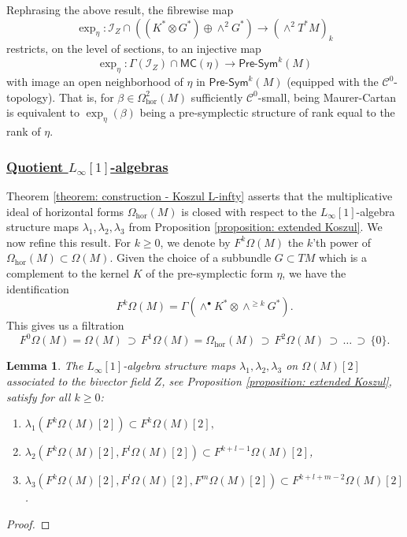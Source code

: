 \documentclass[11pt,thmsa]{amsart}
\newtheorem{lemma}[theorem]{Lemma}
\theoremstyle{definition}
\newcommand{\Presym}{\mathsf{Pre}\textrm{-}\mathsf{Sym}}
\newcommand{\hor}{\mathrm{hor}}
\newcommand{\MC}{\mathsf{MC}}
\begin{document}
{Rephrasing the above result, the fibrewise map
$$ \exp_\eta: \mathcal{I}_Z \cap ((K^*\otimes G^*)\oplus \wedge^2 G^*) \to (\wedge^2 T^*M)_k$$
restricts, on the level of sections, to an injective map
$$\boxed{ \exp_\eta: \Gamma(\mathcal{I}_Z)\cap \MC(\eta) \to  \Presym^k(M)}$$
with image an open neighborhood of $\eta$ in 
$\Presym^k(M)$ (equipped with the $\mathcal{C}^0$-topology). That is, for $\beta\in \Omega^2_\hor(M)$ sufficiently $\mathcal{C}^0$-small,
being Maurer-Cartan is equivalent to $\exp_\eta(\beta)$
being a pre-symplectic structure of rank equal to the rank of $\eta$.
 


\subsubsection {\underline{Quotient $L_{\infty}[1]$-algebras}} 


Theorem \ref{theorem: construction - Koszul L-infty} asserts that the multiplicative ideal of horizontal forms $\Omega_\hor(M)$
is closed with respect to the $L_\infty[1]$-algebra structure
maps $\lambda_1,\lambda_2,\lambda_3$ from Proposition \ref{proposition: extended Koszul}. We now refine this result. For $k\ge 0$, we denote by 
$F^{k}\Omega(M)$ the $k$'th power of $\Omega_\hor(M)\subset \Omega(M)$. Given the choice of a subbundle $G\subset TM$ which is a complement to the kernel $K$ of the pre-symplectic form $\eta$, we have the  identification 
$$F^k\Omega(M)=\Gamma(\wedge^{\bullet}K^*\otimes \wedge^{\ge k}G^*).$$
This gives us a filtration
$$F^{0}\Omega(M)=\Omega(M) \, \supset \, F^{1}\Omega(M)=\Omega_\hor(M) \, \supset \, F^{2}\Omega(M)\,  \supset \, \dots \, \supset \, \{0\}.$$
 

  
 \begin{lemma}\label{lem:degrees}
The $L_\infty[1]$-algebra structure maps $\lambda_1,\lambda_2,\lambda_3$ on $\Omega(M)[2]$ associated to the bivector field $Z$, see Proposition \ref{proposition: extended Koszul}, satisfy for all $k\ge 0$:
\begin{enumerate}
\item[i)] $\lambda_1(F^{k}\Omega(M)[2])\subset F^{k}\Omega(M)[2],$
\item[ii)] $\lambda_2(F^{k}\Omega(M)[2],F^{l}\Omega(M)[2])\subset F^{k+l-1}\Omega(M)[2]$,
\item[iii)] $\lambda_3(F^{k}\Omega(M)[2],F^{l}\Omega(M)[2],F^{m}\Omega(M)[2])\subset F^{k+l+m-2}\Omega(M)[2]$.
\end{enumerate}
\end{lemma}
\begin{proof}


\end{proof}}
\end{document}
